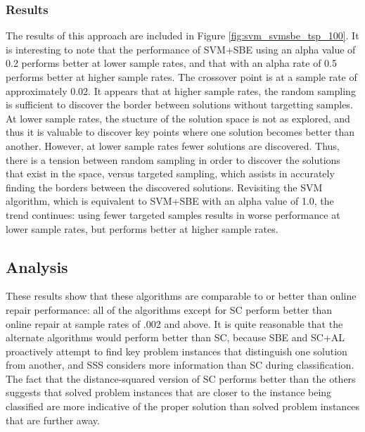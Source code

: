 \subsubsection{Results} The results of this approach are included in Figure \ref{fig:svm_svmsbe_tsp_100}.  It is interesting to note that the performance of SVM+SBE using an alpha value of 0.2 performs better at lower sample rates, and that with an alpha rate of 0.5 performs better at higher sample rates.  The crossover point is at a sample rate of approximately 0.02.  It appears that at higher sample rates, the random sampling is sufficient to discover the border between solutions without targetting samples.  At lower sample rates, the stucture of the solution space is not as explored, and thus it is valuable to discover key points where one solution becomes better than another.  However, at lower sample rates fewer solutions are discovered.  Thus, there is a tension between random sampling in order to discover the solutions that exist in the space, versus targeted sampling, which assists in accurately finding the borders between the discovered solutions.  Revisiting the SVM algorithm, which is equivalent to SVM+SBE with an alpha value of 1.0, the trend continues:  using fewer targeted samples results in worse performance at lower sample rates, but performs better at higher sample rates.






\subsection{Analysis}

These results show that these algorithms are comparable to or better than online repair performance:  all of the algorithms except for SC perform better than online repair at sample rates of .002 and above.  It is quite reasonable that the alternate algorithms would perform better than SC, because SBE and SC+AL proactively attempt to find key problem instances that distinguish one solution from another, and SSS considers more information than SC during classification.  The fact that the distance-squared version of SC performs better than the others suggests that solved problem instances that are closer to the instance being classified are more indicative of the proper solution than solved problem instances that are further away.

